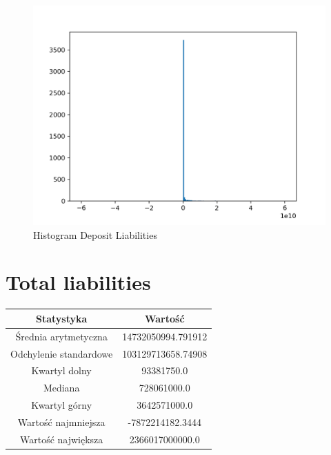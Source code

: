 \documentclass{article}
\begin{document}
\begin{figure}[h!]
    \includegraphics[width=\linewidth]{variables/Deposit Liabilities.png}
    \caption{Histogram Deposit Liabilities }
\end{figure}\section{ Total liabilities }

\begin{center}
    \begin{tabular}{|c | c|} 
    \hline
    Statystyka & Wartość \\
    \hline\hline
    Średnia arytmetyczna & 14732050994.791912 \\ 
    \hline
    Odchylenie standardowe & 103129713658.74908 \\
    \hline
    Kwartyl dolny & 93381750.0 \\
    \hline
    Mediana & 728061000.0 \\
    \hline
    Kwartyl górny & 3642571000.0 \\
    \hline
    Wartość najmniejsza & -7872214182.3444 \\
    \hline
    Wartość największa & 2366017000000.0 \\
    \hline
   \end{tabular}
\end{center}
\end{document}
